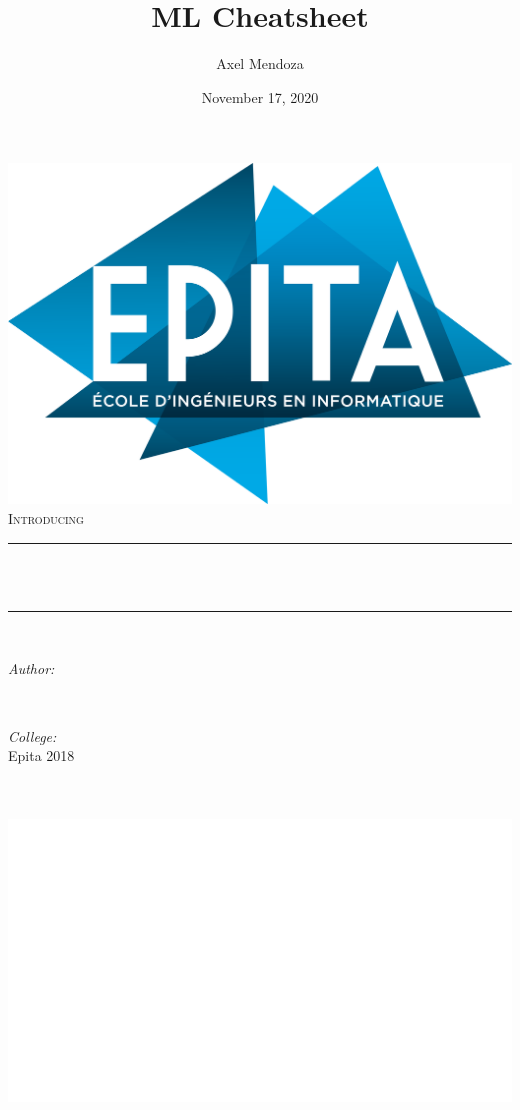 \documentclass[12pt]{report}
\title{ML Cheatsheet}								%
\author{Axel Mendoza}								%
\date{November 17, 2020}											%
\makeatletter
\let\thetitle\@title
\let\theauthor\@author
\let\thedate\@date
\makeatother
\begin{document}

\begin{titlepage}
	\centering
    \includegraphics[width=0.51\linewidth]{images/epita_logo.png}\\[2.0 cm]	%
    \textsc{\Large Introducing}\\[0.4 cm]
	\rule{\linewidth}{0.2 mm} \\[0.4 cm]
	{ \huge \bfseries \thetitle}\\
	\rule{\linewidth}{0.2 mm} \\[0.6 cm]
	
	\begin{minipage}{0.4\textwidth}
		\begin{flushleft} \large
			\emph{Author:}\\
			\theauthor
			\end{flushleft}
			\end{minipage}~
			\begin{minipage}{0.4\textwidth}
			\begin{flushright} \large
			\emph{College:} \\
            Epita 2018									%
		\end{flushright}
		
	\end{minipage}\\[0.6 cm]
	
	{\large \thedate}\\[2 cm]
    \includegraphics[width=0.45\linewidth]{images/58065.jpg}\\[2.0 cm]	%
	\vfill
	
\end{titlepage}
\end{document}
